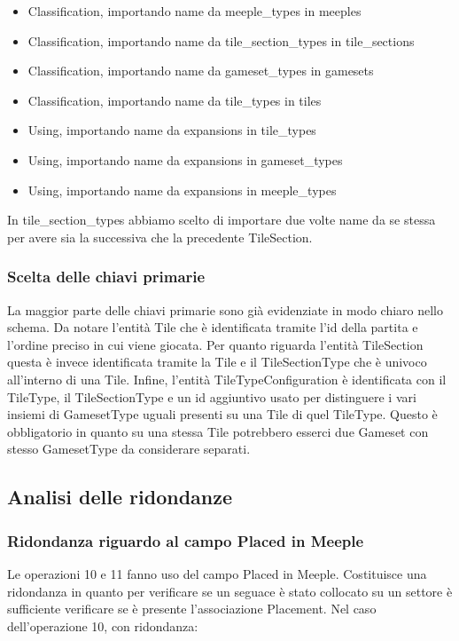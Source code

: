 \begin{itemize}
    \item Classification, importando name da meeple\_types in meeples
    \item Classification, importando name da tile\_section\_types in tile\_sections
    \item Classification, importando name da gameset\_types in gamesets
    \item Classification, importando name da tile\_types in tiles
    \item Using, importando name da expansions in tile\_types
    \item Using, importando name da expansions in gameset\_types
    \item Using, importando name da expansions in meeple\_types
\end{itemize}
In tile\_section\_types abbiamo scelto di importare due volte name da se stessa per avere sia la successiva che la precedente TileSection.

\subsubsection*{Scelta delle chiavi primarie}
La maggior parte delle chiavi primarie sono già evidenziate in modo chiaro nello schema. Da notare l'entità Tile che è identificata tramite l'id della partita e l'ordine preciso in cui viene giocata. Per quanto riguarda l'entità TileSection questa è invece identificata tramite la Tile e il TileSectionType che è univoco all'interno di una Tile. Infine, l'entità TileTypeConfiguration è identificata con il TileType, il TileSectionType e un id aggiuntivo usato per distinguere i vari insiemi di GamesetType uguali presenti su una Tile di quel TileType. Questo è obbligatorio in quanto su una stessa Tile potrebbero esserci due Gameset con stesso GamesetType da considerare separati.

\subsection{Analisi delle ridondanze}

\subsubsection*{Ridondanza riguardo al campo Placed in Meeple}
Le operazioni 10 e 11 fanno uso del campo Placed in Meeple. Costituisce una ridondanza in quanto per verificare se un seguace è stato collocato su un settore è sufficiente verificare se è presente l'associazione Placement. Nel caso dell'operazione 10, con ridondanza:
\medskip

